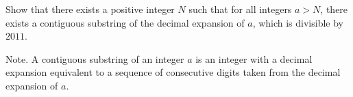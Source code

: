 Show that there exists a positive integer $N$ such that for all integers $a>N$,  there exists a contiguous substring of the decimal expansion of $a$,  which is divisible by $2011$.

Note. A contiguous substring of an integer $a$ is an integer with a decimal expansion equivalent to a sequence of consecutive digits taken from the decimal expansion of $a$.